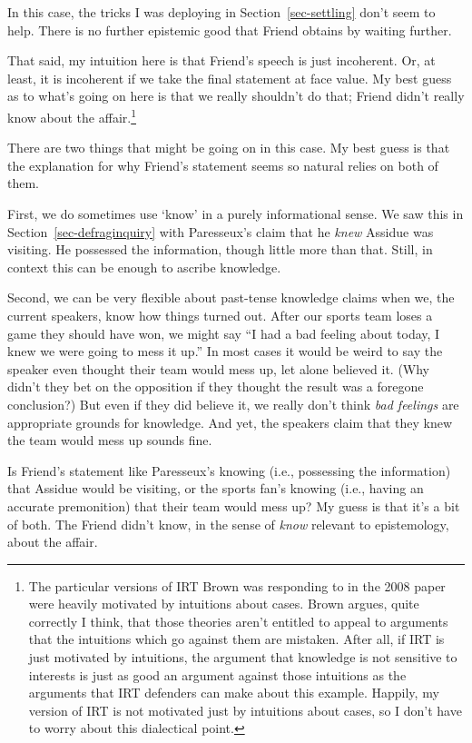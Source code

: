 \documentclass[
  12pt,
  letterpaper,
]{scrbook}
\begin{document}
In this case, the tricks I was deploying in Section~\ref{sec-settling}
don't seem to help. There is no further epistemic good that Friend
obtains by waiting further.

That said, my intuition here is that Friend's speech is just incoherent.
Or, at least, it is incoherent if we take the final statement at face
value. My best guess as to what's going on here is that we really
shouldn't do that; Friend didn't really know about the
affair.\footnote{The particular versions of IRT Brown was responding to
  in the 2008 paper were heavily motivated by intuitions about cases.
  Brown argues, quite correctly I think, that those theories aren't
  entitled to appeal to arguments that the intuitions which go against
  them are mistaken. After all, if IRT is just motivated by intuitions,
  the argument that knowledge is not sensitive to interests is just as
  good an argument against those intuitions as the arguments that IRT
  defenders can make about this example. Happily, my version of IRT is
  not motivated just by intuitions about cases, so I don't have to worry
  about this dialectical point.}

There are two things that might be going on in this case. My best guess
is that the explanation for why Friend's statement seems so natural
relies on both of them.

First, we do sometimes use `know' in a purely informational sense. We
saw this in Section~\ref{sec-defraginquiry} with Paresseux's claim that
he \emph{knew} Assidue was visiting. He possessed the information,
though little more than that. Still, in context this can be enough to
ascribe knowledge.

Second, we can be very flexible about past-tense knowledge claims when
we, the current speakers, know how things turned out. After our sports
team loses a game they should have won, we might say ``I had a bad
feeling about today, I knew we were going to mess it up.'' In most cases
it would be weird to say the speaker even thought their team would mess
up, let alone believed it. (Why didn't they bet on the opposition if
they thought the result was a foregone conclusion?) But even if they did
believe it, we really don't think \emph{bad feelings} are appropriate
grounds for knowledge. And yet, the speakers claim that they knew the
team would mess up sounds fine.

Is Friend's statement like Paresseux's knowing (i.e., possessing the
information) that Assidue would be visiting, or the sports fan's knowing
(i.e., having an accurate premonition) that their team would mess up? My
guess is that it's a bit of both. The Friend didn't know, in the sense
of \emph{know} relevant to epistemology, about the affair.
\end{document}
